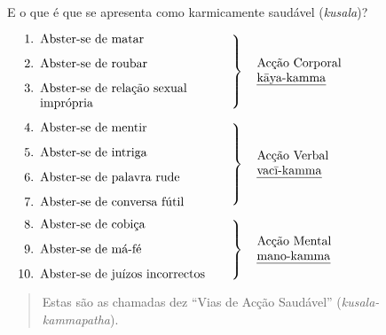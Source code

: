 E o que é que se apresenta como karmicamente saudável (\emph{kusala})?

\bigskip

$\left.
\begin{minipage}{0.52\linewidth}
\raggedright
\begin{enumerate}
  \item Abster-se de matar
  \item Abster-se de roubar
  \item Abster-se de relação sexual imprópria
\end{enumerate}
\end{minipage}
\right\}
\hspace*{10pt}\parbox{0.4\linewidth}{Acção Corporal\\ \emph{kāya-kamma}}
$

\bigskip

$\left.
\begin{minipage}{0.52\linewidth}
\raggedright
\begin{enumerate}
\setcounter{enumi}{3}
  \item Abster-se de mentir
  \item Abster-se de intriga
  \item Abster-se de palavra rude
  \item Abster-se de conversa fútil
\end{enumerate}
\end{minipage}
\right\}
\hspace*{10pt}\parbox{0.4\linewidth}{Acção Verbal\\ \emph{vacī-kamma}}
$

\bigskip

$\left.
\begin{minipage}{0.52\linewidth}
\raggedright
\begin{enumerate}
\setcounter{enumi}{7}
  \item Abster-se de cobiça
  \item Abster-se de má-fé
  \item Abster-se de juízos incorrectos
\end{enumerate}
\end{minipage}
\right\}
\hspace*{10pt}\parbox{0.4\linewidth}{Acção Mental\\ \emph{mano-kamma}}
$


\begin{quote}
  Estas são as chamadas dez “Vias de Acção Saudável” (\emph{kusala-kammapatha}).
\end{quote}


